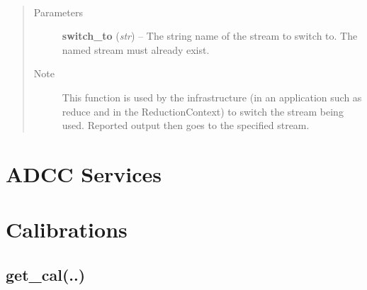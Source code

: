 \documentclass[letterpaper,10pt,english]{sphinxmanual}
\begin{document}
\begin{fulllineitems}
\label{chapter_ReductionContextClass:astrodata.RecipeManager.ReductionContext.switch_stream}~\begin{quote}\begin{description}
\item[{Parameters}] \leavevmode
\textbf{switch\_to} (\emph{str}) -- The string name of the stream to switch to. The 
named stream must already exist.

\item[{Note }] \leavevmode
This function is used by the infrastructure (in an application
such as reduce and in the ReductionContext) to switch the stream
being used. Reported output then goes to the specified stream.

\end{description}\end{quote}

\end{fulllineitems}



\section{ADCC Services}
\label{chapter_ReductionContextClass:adcc-services}

\section{Calibrations}
\label{chapter_ReductionContextClass:calibrations}

\subsection{get\_cal(..)}
\label{chapter_ReductionContextClass:get-cal}
\end{document}

